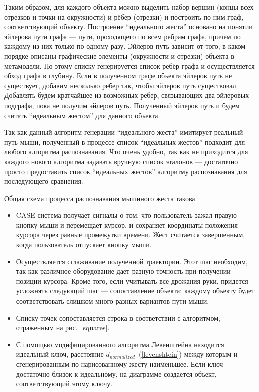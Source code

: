 \documentclass[a5paper]{article}
\begin{document}
Таким образом, для каждого объекта можно выделить набор вершин (концы всех отрезков и точки на окружности) и рёбер (отрезки) и построить по ним граф, соответствующий объекту. Построение ``идеального жеста'' основано на понятии эйлерова пути графа --- пути, проходящего по всем ребрам графа, причем по каждому из них только по одному разу. Эйлеров путь зависит от того, в каком порядке описаны графические элементы (окружности и отрезки) объекта в метамодели. По этому списку генерируется список ребёр графа и осуществляется обход графа в глубину. Если в полученном графе объекта эйлеров путь не существует, добавим несколько ребер так, чтобы эйлеров путь существовал. Добавлять будем кратчайшее из возможных ребер, связывающих два эйлеровых подграфа, пока не получим эйлеров путь. Полученный эйлеров путь и будем считать ``идеальным жестом'' для данного объекта. 

Так как данный алгоритм генерации ``идеального жеста'' имитирует реальный путь мыши, полученный в процессе список ``идеальных жестов'' подходит для любого алгоритма распознавания. Что очень удобно, так как не приходится для каждого нового алгоритма задавать вручную список эталонов --- достаточно просто предоставить список ``идеальных жестов'' алгоритму распознавания для последующего сравнения.

Общая схема процесса распознавания мышиного жеста такова.

\begin{itemize}
  \item CASE-система получает сигналы о том, что пользователь зажал правую кнопку мыши и перемещает курсор, и сохраняет координаты положения курсора через равные промежутки времени. Жест считается завершенным, когда пользователь отпускает кнопку мыши.
  \item Осуществляется сглаживание полученной траектории. Этот шаг необходим, так как различное оборудование дает разную точность при получении позиции курсора. Кроме того, если учитывать все дрожания руки, придется усложнять следующий шаг --- сопоставление объекта: каждому объекту будет соответствовать слишком много разных вариантов пути мыши.
  \item Списку точек сопоставляется строка в соответствии с алгоритмом, отраженным на рис.~\ref{squares}.
  \item С помощью модифицированного алгоритма Левенштейна находится идеальный ключ, расстояние $d_{normalized}$~(\ref{levenshtein}) между которым и сгенерированным по нарисованному жесту наименьшее. Если ключ достаточно близок к идеальному, на диаграмме создается объект, соответствующий этому ключу.
\end{itemize}
\end{document}

